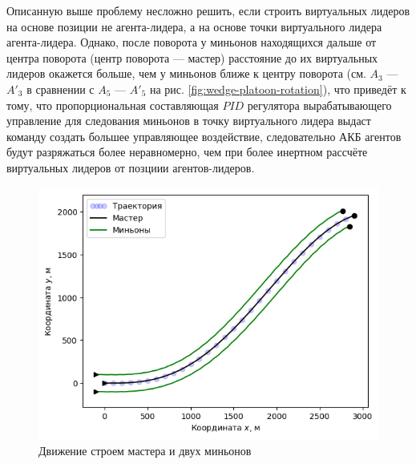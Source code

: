 \documentclass[a4paper, 14pt]{extarticle}
\begin{document}
Описанную выше проблему несложно решить, если строить виртуальных лидеров на основе позиции не агента-лидера, а на основе точки виртуального лидера агента-лидера. Однако, после поворота у миньонов находящихся дальше от центра поворота (центр поворота — мастер) расстояние до их виртуальных лидеров окажется больше, чем у миньонов ближе к центру поворота (см. $A_3$ — $A'_3$ в сравнении с $A_5$ — $A'_5$ на рис. \ref{fig:wedge-platoon-rotation}), что приведёт к тому, что пропорциональная составляющая $PID$ регулятора вырабатывающего управление для следования миньонов в точку виртуального лидера выдаст команду создать большее управляющее воздействие, следовательно АКБ агентов будут разряжаться более неравномерно, чем при более инертном рассчёте виртуальных лидеров от позциии агентов-лидеров.

\begin{figure}[!htbp]
	\centering
	\includegraphics[width=0.7\linewidth]{platoon-trajectory-0}
	\caption{Движение строем мастера и двух миньонов}
	\label{fig:platoon-trajectory-0}
\end{figure}


\newpage
\end{document}
